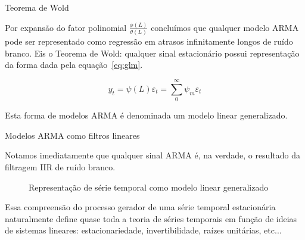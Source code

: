 \documentclass [xcolor=svgnames, t] {beamer}
\begin{document}
\begin{frame}{Teorema de Wold}

Por expansão do fator polinomial $\frac{\phi(L)}{\theta(L)}$ concluímos que
qualquer modelo ARMA pode ser representado como regressão em atrasos
infinitamente longos de ruído branco. Eis o Teorema de Wold: qualquer sinal
estacionário possui representação da forma dada pela equação~\ref{eq:glm}.

\vspace{5mm}

\begin{equation}\label{eq:glm}
    y_t = \psi(L)\varepsilon_t = \sum^{\infty}_{0} \psi_m \varepsilon_t
\end{equation}

\vspace{5mm}

Esta forma de modelos ARMA é denominada um modelo linear generalizado.


\end{frame}

\begin{frame}{Modelos ARMA como filtros lineares}

Notamos imediatamente que qualquer sinal ARMA é, na verdade, o resultado da
filtragem IIR de ruído branco.

\vspace{5mm}

\begin{figure}
    \centering
    \vspace{.6cm}
    \caption{Representação de série temporal como modelo linear generalizado}
    \label{fig:white_noise_LTI}
\end{figure}

Essa compreensão do processo gerador de uma série temporal estacionária
naturalmente define quase toda a teoria de séries temporais em função de
ideias de sistemas lineares: estacionariedade, invertibilidade, raízes
unitárias, etc...

\end{frame}
\end{document}
